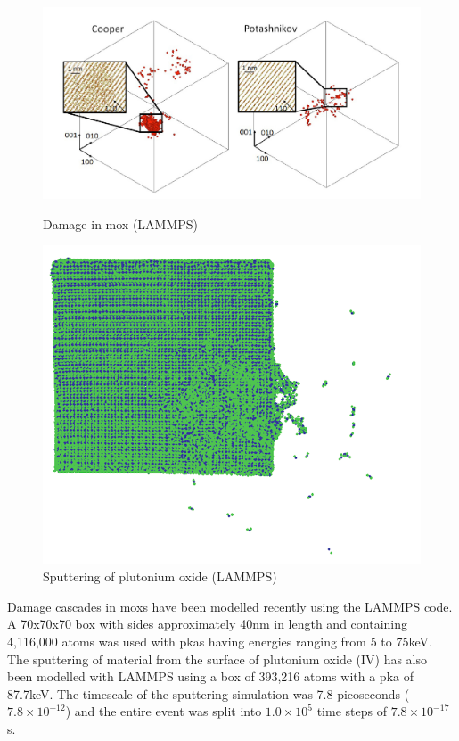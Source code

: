 \FloatBarrier
\begin{figure}[!htb]
\includegraphics[width=\linewidth]{chapters/background_potential_fitting/images/puo2damage.png}
\caption{Damage in \acrshort{mox} (LAMMPS)\cite{moxlammpsdamage}}
\label{fig:feeosplot1}
\endminipage\hfill
{}
\includegraphics[width=\linewidth]{chapters/background_potential_fitting/images/puo-sputtering.png}
\caption{Sputtering of plutonium oxide (LAMMPS)\cite{pusputtering}}
\label{fig:feecplot1}
\endminipage
\end{figure}
\FloatBarrier

Damage cascades in \acrlong{mox}s have been modelled recently using the LAMMPS code.  A 70x70x70 box with sides approximately 40nm in length and containing 4,116,000 atoms was used with \acrshort{pka}s having energies ranging from 5 to 75keV\cite{moxlammpsdamage}.  The sputtering of material from the surface of plutonium oxide (IV) has also been modelled with LAMMPS using a box of 393,216 atoms with a \acrshort{pka} of 87.7keV.  The timescale of the sputtering simulation was 7.8 picoseconds ($7.8 \times 10^{-12}$) and the entire event was split into $1.0 \times 10^{5}$ time steps of $7.8 \times 10^{-17}$s.

